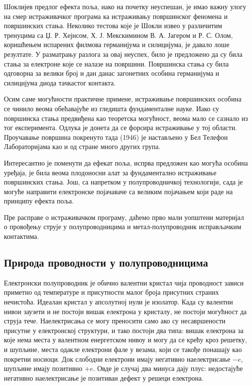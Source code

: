 \documentclass{article}
\begin{document}
Шоклијев предлог ефекта поља, иако на почетку неуспешан, је имао важну улогу на смер истраживачког програма ка истраживању површинског феномена и површинских стања. Неколико тестова које је Шокли извео у различитим тренуцима са Џ. Р. Хејнсом, Х. Ј. Мекскимином В. А. Јагером и Р. С. Олом, коришћењем испарених филмова германијума и силицијума, је давало лоше резултате. У разматрању разлога за овај неуспех, било је предложено да су била стања за електроне које се налазе на површини. Површинска стања су била одговорна за велики број и дан данас загонетних особина германијума и силицијума диода тачкастог контакта.

Осим саме могућности практичне примене, истраживање површинских особина се чинило веома обећавајуће из гледишта фундаменталне науке. Иако су површинска стања предвиђена као теоретска могућност, веома мало се сазнало из тог експеримента. Одлука је донета да се форсира истраживање у тој области. Проучавање површина покренуто тада (1946) је настављено у Бел Телефон Лабораторијама као и од стране много других група. 

Интересантно је поменути да ефекат поља, испрва предложен као могућа особина уређаја, је била веома плодоносни алат за фундаментално истраживање површинских стања. Још, са напретком у полупроводничкој технологији, сада је могуће направити електронске појачаваче са великим појачањем који раде на принципу ефекта поља. 

Пре расправе о истраживачком програму, даћемо прво мали уопштени материјал о провођењу струје у полупроводницима и метал-полупроводник исправљачким контактима.

\subsection{Природа проводности у полупроводницима}


Електронски полупроводник је обично валентни кристал чија проводност зависи приметно од температуре и присутности малог броја присутних страних нечистоћа. Идеалан кристал у апсолутној нули је изолатор. Када су валентни нивои заузети и не постоји вишак електрона у кристалу, не постоји могућност да струја тече. Наелектрисања се могу преносити само ако су несавршености присутне у електронској структури, и тако постоји два типа: вишак електрона за које нема места у валентном енергетском нивоу и могу да се крећу кроз решетку, и шупљине, места одакле електрони фале у везама, који се такође понашају као покретни носиоци. Док слободни електрони имају негативно наелектрисање $-e$, шупљине имају позитивно $+e$. Овде је случај два минуса дају плус: недостајуће негативно наелектрисање је позитиван дефект у решеци електрона.
\end{document}
